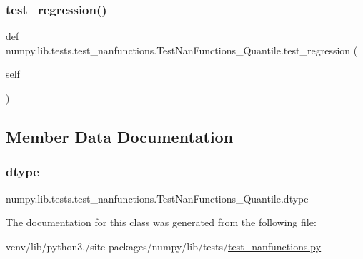 \subsubsection{\texorpdfstring{test\+\_\+regression()}{test\_regression()}}
{\footnotesize\ttfamily def numpy.\+lib.\+tests.\+test\+\_\+nanfunctions.\+Test\+Nan\+Functions\+\_\+\+Quantile.\+test\+\_\+regression (\begin{DoxyParamCaption}\item[{}]{self }\end{DoxyParamCaption})}



\subsection{Member Data Documentation}
\mbox{\label{classnumpy_1_1lib_1_1tests_1_1test__nanfunctions_1_1TestNanFunctions__Quantile_a041cddc6aea7b536313a7b42b1046018}} 
\subsubsection{\texorpdfstring{dtype}{dtype}}
{\footnotesize\ttfamily numpy.\+lib.\+tests.\+test\+\_\+nanfunctions.\+Test\+Nan\+Functions\+\_\+\+Quantile.\+dtype\hspace{0.3cm}{\ttfamily [static]}}



The documentation for this class was generated from the following file\+:\begin{DoxyCompactItemize}
\item 
venv/lib/python3./site-\/packages/numpy/lib/tests/\hyperlink{test__nanfunctions_8py}{test\+\_\+nanfunctions.\+py}\end{DoxyCompactItemize}
